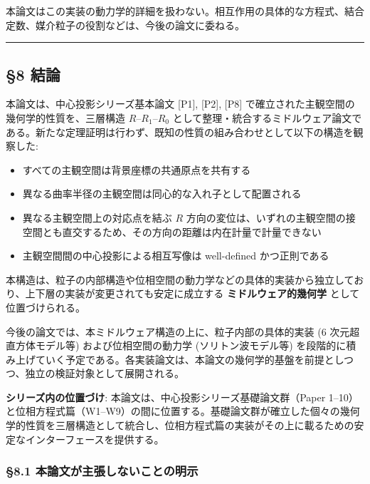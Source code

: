 \documentclass[
  a4paper,11pt]{ltjsarticle}
\providecommand{\tightlist}{%
  \setlength{\itemsep}{0pt}\setlength{\parskip}{0pt}}
\begin{document}
本論文はこの実装の動力学的詳細を扱わない。相互作用の具体的な方程式、結合定数、媒介粒子の役割などは、今後の論文に委ねる。

\begin{center}\rule{0.5\linewidth}{0.5pt}\end{center}

\subsection{§8 結論}\label{ux7d50ux8ad6}

本論文は、中心投影シリーズ基本論文 {[}P1{]}, {[}P2{]}, {[}P8{]}
で確立された主観空間の幾何学的性質を、三層構造 \(R\)--\(R_1\)--\(R_0\)
として整理・統合するミドルウェア論文である。新たな定理証明は行わず、既知の性質の組み合わせとして以下の構造を観察した:

\begin{itemize}
\tightlist
\item
  すべての主観空間は背景座標の共通原点を共有する
\item
  異なる曲率半径の主観空間は同心的な入れ子として配置される
\item
  異なる主観空間上の対応点を結ぶ \(R\)
  方向の変位は、いずれの主観空間の接空間とも直交するため、その方向の距離は内在計量で計量できない
\item
  主観空間間の中心投影による相互写像は well-defined かつ正則である
\end{itemize}

本構造は、粒子の内部構造や位相空間の動力学などの具体的実装から独立しており、上下層の実装が変更されても安定に成立する
\textbf{ミドルウェア的幾何学} として位置づけられる。

今後の論文では、本ミドルウェア構造の上に、粒子内部の具体的実装 (6
次元超直方体モデル等) および位相空間の動力学 (ソリトン波モデル等)
を段階的に積み上げていく予定である。各実装論文は、本論文の幾何学的基盤を前提としつつ、独立の検証対象として展開される。

\textbf{シリーズ内の位置づけ}:
本論文は、中心投影シリーズ基礎論文群（Paper
1--10）と位相方程式篇（W1--W9）の間に位置する。基礎論文群が確立した個々の幾何学的性質を三層構造として統合し、位相方程式篇の実装がその上に載るための安定なインターフェースを提供する。

\subsubsection{§8.1
本論文が主張しないことの明示}\label{ux672cux8ad6ux6587ux304cux4e3bux5f35ux3057ux306aux3044ux3053ux3068ux306eux660eux793a}
\end{document}
